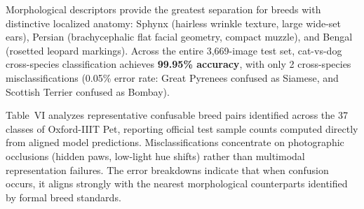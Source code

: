 \documentclass[conference]{IEEEtran}
\begin{document}
Morphological descriptors provide the greatest separation for breeds with distinctive localized anatomy: Sphynx (hairless wrinkle texture, large wide-set ears), Persian (brachycephalic flat facial geometry, compact muzzle), and Bengal (rosetted leopard markings). Across the entire 3,669-image test set, cat-vs-dog cross-species classification achieves \textbf{99.95\% accuracy}, with only 2 cross-species misclassifications (0.05\% error rate: Great Pyrenees confused as Siamese, and Scottish Terrier confused as Bombay).

Table~VI analyzes representative confusable breed pairs identified across the 37 classes of Oxford-IIIT Pet, reporting official test sample counts computed directly from aligned model predictions. Misclassifications concentrate on photographic occlusions (hidden paws, low-light hue shifts) rather than multimodal representation failures. The error breakdowns indicate that when confusion occurs, it aligns strongly with the nearest morphological counterparts identified by formal breed standards.
\end{document}

